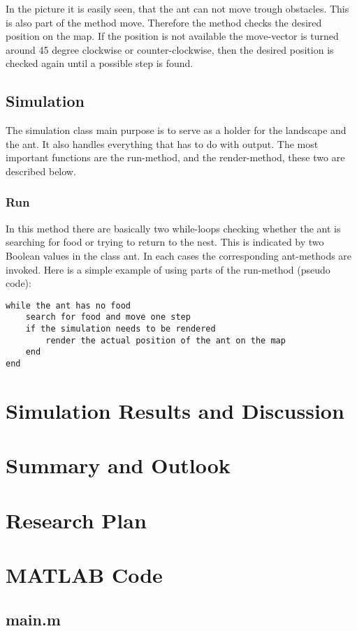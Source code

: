 \documentclass[11pt]{article}
\begin{document}
In the picture it is easily seen, that the ant can not move trough obstacles. This is also part of the method move. Therefore the method checks the desired position on the map. If the position is not available the move-vector is turned around 45 degree clockwise or counter-clockwise, then the desired position is checked again until a possible step is found.

\subsection{Simulation}
The simulation class main purpose is to serve as a holder for the landscape and the ant. It also handles everything that has to do with output. The most important functions are the run-method, and the render-method, these two are described below.
\subsubsection{Run}
In this method there are basically two while-loops checking whether the ant is searching for food or trying to return to the nest. This is indicated by two Boolean values in the class ant. In each cases the corresponding ant-methods are invoked. Here is a simple example of using parts of the run-method (pseudo code):
\begin{lstlisting}
while the ant has no food
	search for food and move one step
	if the simulation needs to be rendered
		render the actual position of the ant on the map
	end
end
\end{lstlisting}
\section{Simulation Results and Discussion}

\section{Summary and Outlook}

\appendix

\section{Research Plan}

\section{MATLAB Code}
\subsection{main.m}

\end{document}

